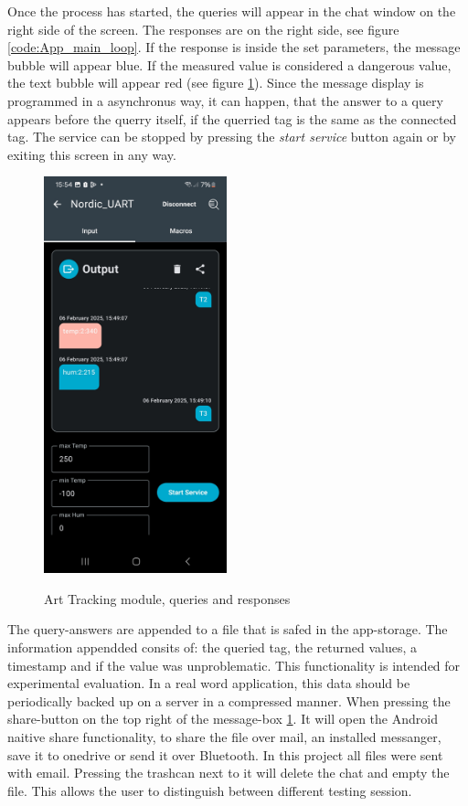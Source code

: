 Once the process has started, the queries will appear in the chat window on the right side of the screen.
The responses are on the right side, see figure \ref{code:App_main_loop}.
If the response is inside the set parameters, the message bubble will appear blue.
If the measured value is considered a dangerous value, the text bubble will appear red (see figure \ref{f:Toolbox_art_filled}).
Since the message display is programmed in a asynchronus way, it can happen, that the answer to a query appears before the querry itself, if the querried tag is the same as the connected tag.
The service can be stopped by pressing the \textit{start service} button again or by exiting this screen in any way.


\begin{figure}[ht!]
\centering
 \caption{Art Tracking module, queries and responses}
\includegraphics[width=200px]{graphics/nRF_toolbox_Bad_Value_2.jpg}
\label{f:Toolbox_art_filled}
\end{figure}


The query-answers are appended to a file that is safed in the app-storage.
The information appendded consits of: the queried tag, the returned values, a timestamp and if the value was unproblematic.
This functionality is intended for experimental evaluation. 
In a real word application, this data should be periodically backed up on a server in a compressed manner.
When pressing the share-button on the top right of the message-box \ref{f:Toolbox_art_filled}.
It will open the Android naitive share functionality, to share the file over mail, an installed messanger, save it to onedrive or send it over Bluetooth.
In this project all files were sent with email.
Pressing the trashcan next to it will delete the chat and empty the file.
This allows the user to distinguish between different testing session.